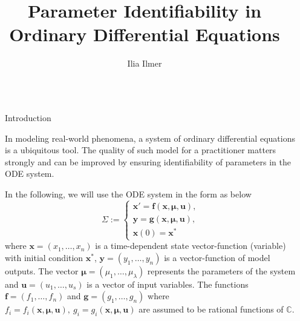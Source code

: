 \documentclass[final]{beamer}
\title{Parameter Identifiability in Ordinary Differential Equations}
\author{Ilia Ilmer\inst{1}}
\institute[shortinst]{\inst{1} Graduate Center CUNY}
\newlength{\sepwidth}
\newlength{\colwidth}
\newcommand{\separatorcolumn}{\begin{column}{\sepwidth}\end{column}}
\begin{document}
\begin{frame}[t]
  \begin{columns}[t]
    \separatorcolumn

    \begin{column}{\colwidth}

      \begin{block}{Introduction}

        In modeling real-world phenomena, a system of ordinary differential equations is a ubiquitous tool. The quality of such model for a practitioner matters strongly and can be improved by ensuring identifiability of parameters in the ODE system.

        In the following, we will use the ODE system in the form as below
        \begin{equation}
          \Sigma := \begin{cases}
            \mathbf{x}' = \mathbf{f}(\mathbf{x}, \boldsymbol{\mu}, \mathbf{u}), \\
            \mathbf{y} = \mathbf{g}(\mathbf{x}, \boldsymbol{\mu}, \mathbf{u}),  \\
            \mathbf{x}(0) = \mathbf{x}^{\ast}
          \end{cases}
          \label{ode}
        \end{equation}
        where \(\mathbf{x}=(x_1,\dots, x_n)\) is a time-dependent state vector-function (variable) with initial condition \(\mathbf{x}^{\ast}\), \(\mathbf{y}=(y_1,\dots, y_n)\) is a vector-function of model outputs. The vector \(\boldsymbol{\mu}=(\mu_1,\dots,\mu_{\lambda})\) represents the parameters of the system and \(\mathbf{u}=(u_1,\dots,u_s)\) is a vector of input variables.
        The functions \(\mathbf{f}=(f_1,\dots,f_n)\) and \(\mathbf{g}=(g_1,\dots,g_n)\) where
        \(f_i=f_i(\mathbf{x}, \boldsymbol{\mu}, \mathbf{u}),~g_i=g_i(\mathbf{x}, \boldsymbol{\mu}, \mathbf{u})\)
        are assumed to be rational functions of \(\mathbb{C}\).
      \end{block}


\end{column}
\end{columns}
\end{frame}
\end{document}
